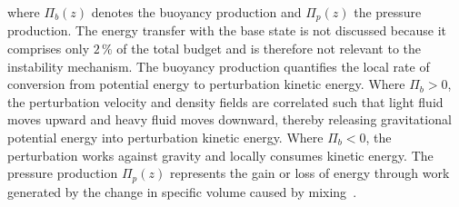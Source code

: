 \documentclass[11pt]{article}
\begin{document}
where \(\Pi_b(z)\) denotes the buoyancy production and \(\Pi_p(z)\) the pressure production. The energy transfer with the base state is not discussed because it comprises only \(2\,\%\) of the total budget and is therefore not relevant to the instability mechanism. The buoyancy production quantifies the local rate of conversion from potential energy to perturbation kinetic energy. Where \(\Pi_b > 0\), the perturbation velocity and density fields are correlated such that light fluid moves upward and heavy fluid moves downward, thereby releasing gravitational potential energy into perturbation kinetic energy. Where \(\Pi_b < 0\), the perturbation works against gravity and locally consumes kinetic energy. The pressure production \(\Pi_p(z)\) represents the gain or loss of energy through work generated by the change in specific volume caused by mixing~\citep{livescu-ristorcelli-2007}.
\end{document}
